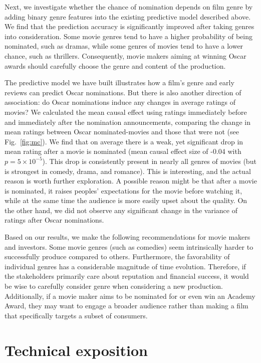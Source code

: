 \documentclass[dvipsnames]{article}
\begin{document}
Next, we investigate whether the chance of nomination depends on film genre by adding binary genre features into the existing predictive model described above. We find that the prediction accuracy is significantly improved after taking genres into consideration. Some movie genres tend to have a higher probability of being nominated, such as dramas, while some genres of movies tend to have a lower chance, such as thrillers. Consequently, movie makers aiming at winning Oscar awards should carefully choose the genre and content of the production.

The predictive model we have built illustrates how a film's genre and early reviews can predict Oscar nominations. But there is also another direction of association: do Oscar nominations induce any changes in average ratings of movies? We calculated the mean causal effect using ratings immediately before and immediately after the nomination announcements, comparing the change in mean ratings between Oscar nominated-movies and those that were not (see Fig.~\ref{fig:mc}). We find that on average there is a weak, yet significant drop in mean rating after a movie is nominated (mean causal effect size of -0.04 with $p=5\times 10^{-5}$). This drop is consistently present in nearly all genres of movies (but is strongest in comedy, drama, and romance). This is interesting, and the actual reason is worth further exploration. A possible reason might be that after a movie is nominated, it raises peoples' expectations for the movie before watching it, while at the same time the audience is more easily upset about the quality. On the other hand, we did not observe any significant change in the variance of ratings after Oscar nominations.

Based on our results, we make the following recommendations for movie makers and investors. Some movie genres (such as comedies) seem intrinsically harder to successfully produce compared to others. Furthermore, the favorability of individual genres has a considerable magnitude of time evolution. Therefore, if the stakeholders primarily care about reputation and financial success, it would be wise to carefully consider genre when considering a new production. Additionally, if a movie maker aims to be nominated for or even win an Academy Award, they may want to engage a broader audience rather than making a film that specifically targets a subset of consumers.

\section{Technical exposition}
\end{document}
